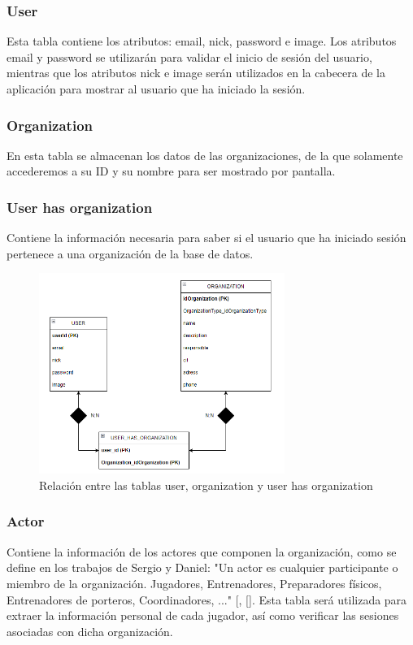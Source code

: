 \subsubsection{User}
Esta tabla contiene los atributos: email, nick, password e image. Los atributos email y password se utilizarán para validar el inicio de sesión del usuario, mientras que los atributos nick e image serán utilizados en la cabecera de la aplicación para mostrar al usuario que ha iniciado la sesión.
\subsubsection{Organization}
En esta tabla se almacenan los datos de las organizaciones, de la que solamente accederemos a su ID y su nombre para ser mostrado por pantalla.
\subsubsection{User has organization}
Contiene la información necesaria para saber si el usuario que ha iniciado sesión pertenece a una organización de la base de datos.
\begin{figure}[H]
    \centering
    \includegraphics[width=8cm]{archivos/tfg_jorge/modelo_logico/rel_user_org}
    \caption{Relación entre las tablas user, organization y user has organization}\label{sistemass2}
\end{figure}
\subsubsection{Actor}
Contiene la información de los actores que componen la organización, como se define en los trabajos de Sergio y Daniel: "Un actor es cualquier participante o miembro de la organización. Jugadores, Entrenadores, Preparadores físicos, Entrenadores de porteros, Coordinadores, ..." [\cite{TFG_Daniel}, [\cite{TFG_Sergio}]. Esta tabla será utilizada para extraer la información personal de cada jugador, así como verificar las sesiones asociadas con dicha organización.
